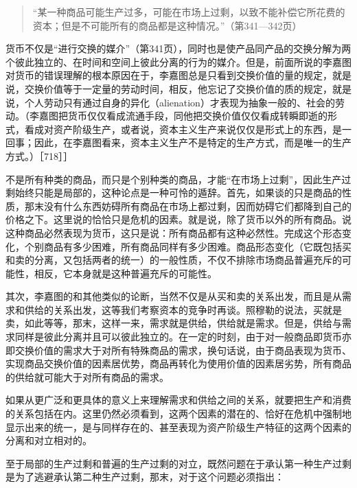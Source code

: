 \begin{quote}{“某一种商品可能生产过多，可能在市场上过剩，以致不能补偿它所花费的资本；但是不可能所有的商品都是这种情况。”（第341—342页）}\end{quote}

货币不仅是“进行交换的媒介”（第341页），同时也是使产品同产品的交换分解为两个彼此独立的、在时间和空间上彼此分离的行为的媒介。但是，前面所说的李嘉图对货币的错误理解的根本原因在于，李嘉图总是只看到交换价值的量的规定，就是说，交换价值等于一定量的劳动时间，相反，他忘记了交换价值的质的规定，就是说，个人劳动只有通过自身的异化（alienation）才表现为抽象一般的、社会的劳动。（李嘉图把货币仅仅看成流通手段，同他把交换价值仅仅看成转瞬即逝的形式，看成对资产阶级生产，或者说，资本主义生产来说仅仅是形式上的东西，是一回事；因此，在李嘉图看来，资本主义生产不是特定的生产方式，而是唯一的生产方式。）［718］］

不是所有种类的商品，而只是个别种类的商品，才能“在市场上过剩”，因此生产过剩始终只能是局部的，这种论点是一种可怜的遁辞。首先，如果谈的只是商品的性质，那末没有什么东西妨碍所有商品在市场上都过剩，因而妨碍它们都降到自己的价格之下。这里说的恰恰只是危机的因素。就是说，除了货币以外的所有商品。说这种商品必然表现为货币，这只是说：所有商品都有这种必然性。完成这个形态变化，个别商品有多少困难，所有商品同样有多少困难。商品形态变化（它既包括买和卖的分离，又包括两者的统一）的一般性质，不仅不排除市场商品普遍充斥的可能性，相反，它本身就是这种普遍充斥的可能性。

其次，李嘉图的和其他类似的论断，当然不仅是从买和卖的关系出发，而且是从需求和供给的关系出发，这等我们考察资本的竞争时再谈。照穆勒的说法，买就是卖，如此等等，那末，这样一来，需求就是供给，供给就是需求。但是，供给与需求同样是彼此分离并且可以彼此独立的。在一定的时刻，由于对一般商品即货币亦即交换价值的需求大于对所有特殊商品的需求，换句话说，由于商品表现为货币、实现商品交换价值的因素居优势，商品再转化为使用价值的因素居劣势，所有商品的供给就可能大于对所有商品的需求。

如果从更广泛和更具体的意义上来理解需求和供给之间的关系，就要把生产和消费的关系包括在内。这里仍然必须看到，这两个因素的潜在的、恰好在危机中强制地显示出来的统一，是与同样存在的、甚至表现为资产阶级生产特征的这两个因素的分离和对立相对的。

至于局部的生产过剩和普遍的生产过剩的对立，既然问题在于承认第一种生产过剩是为了逃避承认第二种生产过剩，那末，对于这个问题必须指出：


